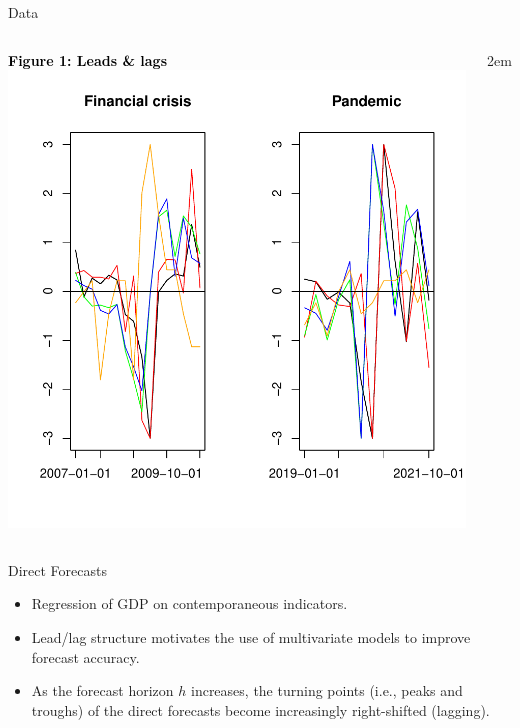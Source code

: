 \documentclass[final]{beamer}
\begin{document}
\begin{frame}
\begin{columns}[T]
\begin{column}{0.48\textwidth}
\begin{block}{\large Data}
\begin{columns}[T]
\begin{center}{\small{\textbf{\textcolor{black}{Figure 1: Leads \& lags}}}}
									    \includegraphics[width=1\textwidth]{./Figures/data_lags.pdf}
									\end{center}
\vspace{-1cm}
								\leftskip2em 
						\end{columns}
				
			
					
				\end{block}
				
		\begin{block}{\large{Direct Forecasts}}
			\begin{itemize}
				\item Regression of GDP on contemporaneous indicators.
				\item Lead/lag structure motivates the use of multivariate models to improve forecast accuracy.
				\item As the forecast horizon $h$ increases, the turning points (i.e., peaks and troughs) of the direct forecasts become increasingly right-shifted (lagging). 
			\end{itemize}
		

\end{block}
\end{column}
\end{columns}
\end{frame}
\end{document}
